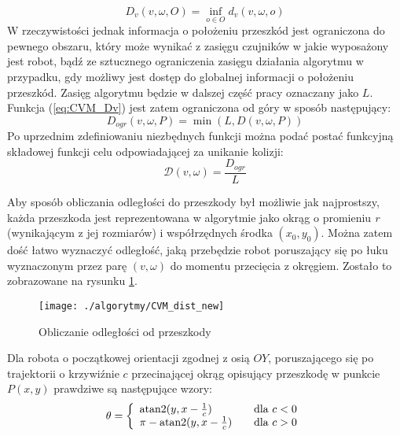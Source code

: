  	\begin{equation}\label{eq:CVM_Dv}
	D_v(v,\omega,O)= \underset{o \in O}{\operatorname{inf}} d_v(v,\omega,o)
	\end{equation}
	W rzeczywistości jednak informacja o położeniu przeszkód jest ograniczona do pewnego obszaru, który może
	wynikać z zasięgu czujników w jakie wyposażony jest robot, bądź ze sztucznego ograniczenia zasięgu działania
	algorytmu w przypadku, gdy możliwy jest dostęp do globalnej informacji o położeniu przeszkód. Zasięg algorytmu  będzie  w dalszej część pracy oznaczany jako $L$. Funkcja  (\ref{eq:CVM_Dv})
	jest zatem ograniczona od góry w sposób następujący:
 	\begin{equation}\label{eq:CVM_Dv_ogr}
	D_{ogr}(v,\omega,P)= \min(L, D(v,\omega,P))
	\end{equation}
	Po uprzednim zdefiniowaniu niezbędnych funkcji  można podać postać funkcyjną składowej funkcji celu odpowiadającej za unikanie kolizji:
	\begin{equation} \label{eq:CVM_dist}
	\mathcal{D}(v,\omega)=\frac{D_{ogr}}{L}
	\end{equation}
 	
	Aby sposób obliczania odległości do przeszkody był możliwie jak najprostszy, każda przeszkoda jest
	reprezentowana w algorytmie jako okrąg o  promieniu \emph{r} (wynikającym z jej rozmiarów) i współrzędnych środka $(x_0,y_0)$. Można zatem dość łatwo wyznaczyć odległość, jaką przebędzie robot poruszający się po łuku wyznaczonym przez parę $(v,\omega)$ do
	momentu przecięcia z okręgiem. Zostało to zobrazowane na rysunku \ref{fig:CVM_dist}.
	\begin{figure}[!b]
	\centering
	\texttt{[image: ./algorytmy/CVM\_dist\_new]}
	\caption{ Obliczanie odległości od przeszkody \label{fig:CVM_dist}}
	\end{figure}
	
	Dla robota o początkowej orientacji zgodnej z osią $OY$, poruszającego się po trajektorii o krzywiźnie $c$ przecinającej
	okrąg opisujący przeszkodę w punkcie $P(x,y)$ prawdziwe są następujące wzory:
	\begin{equation}\label{eq:CVM_teta}
	\theta= \left\{ 
	\begin{array}{l l}
	\text{atan2}(y,x-\frac{1}{c} )& \quad \mbox{dla $c<0$}\\
  	\pi-\text{atan2}(y,x-\frac{1}{c}) & \quad \mbox{dla $c>0$}\\
	\end{array} \right. 
	\end{equation}
	
